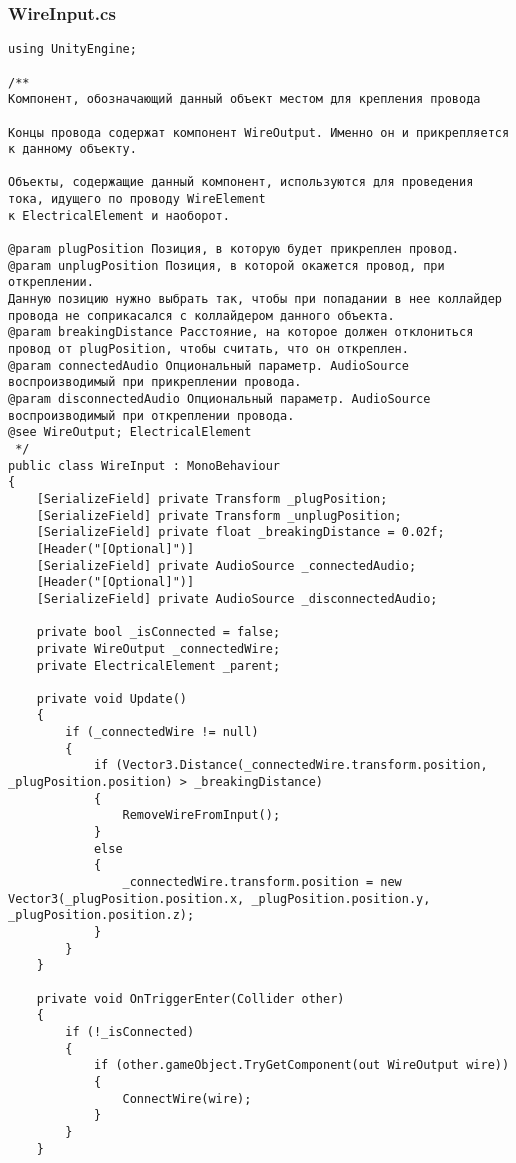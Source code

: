 \subsubsection*{WireInput.cs}
\begin{verbatim}
﻿using UnityEngine;

/**
Компонент, обозначающий данный объект местом для крепления провода

Концы провода содержат компонент WireOutput. Именно он и прикрепляется к данному объекту.

Объекты, содержащие данный компонент, используются для проведения тока, идущего по проводу WireElement
к ElectricalElement и наоборот.

@param plugPosition Позиция, в которую будет прикреплен провод.
@param unplugPosition Позиция, в которой окажется провод, при откреплении. 
Данную позицию нужно выбрать так, чтобы при попадании в нее коллайдер провода не соприкасался с коллайдером данного объекта.
@param breakingDistance Расстояние, на которое должен отклониться провод от plugPosition, чтобы считать, что он откреплен.
@param connectedAudio Опциональный параметр. AudioSource воспроизводимый при прикреплении провода.
@param disconnectedAudio Опциональный параметр. AudioSource воспроизводимый при откреплении провода.
@see WireOutput; ElectricalElement
 */
public class WireInput : MonoBehaviour
{
    [SerializeField] private Transform _plugPosition;
    [SerializeField] private Transform _unplugPosition;
    [SerializeField] private float _breakingDistance = 0.02f;
    [Header("[Optional]")]
    [SerializeField] private AudioSource _connectedAudio;
    [Header("[Optional]")]
    [SerializeField] private AudioSource _disconnectedAudio;

    private bool _isConnected = false;
    private WireOutput _connectedWire;
    private ElectricalElement _parent;

    private void Update()
    {
        if (_connectedWire != null)
        {
            if (Vector3.Distance(_connectedWire.transform.position, _plugPosition.position) > _breakingDistance)
            {
                RemoveWireFromInput();
            }
            else
            {
                _connectedWire.transform.position = new Vector3(_plugPosition.position.x, _plugPosition.position.y, _plugPosition.position.z);
            }
        }
    }

    private void OnTriggerEnter(Collider other)
    {
        if (!_isConnected)
        {
            if (other.gameObject.TryGetComponent(out WireOutput wire))
            {
                ConnectWire(wire);
            }
        }
    }


\end{verbatim}

